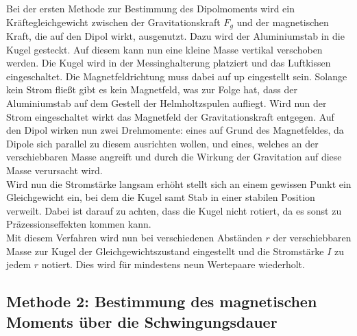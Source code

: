 Bei der ersten Methode zur Bestimmung des Dipolmoments wird ein Kräftegleichgewicht zwischen der Gravitationskraft $F_g$ und der magnetischen Kraft, die auf den Dipol 
wirkt, ausgenutzt. Dazu wird der Aluminiumstab in die Kugel gesteckt. Auf diesem kann nun eine kleine Masse vertikal verschoben werden. Die Kugel wird in der Messinghalterung platziert
und das Luftkissen eingeschaltet. Die Magnetfeldrichtung muss dabei auf \dq up\dq \: eingestellt sein. Solange kein Strom fließt gibt es kein Magnetfeld, was zur Folge hat,
dass der Aluminiumstab auf dem Gestell der Helmholtzspulen aufliegt. Wird nun der Strom eingeschaltet wirkt das Magnetfeld der Gravitationskraft entgegen.
Auf den Dipol wirken nun zwei Drehmomente: eines auf Grund des Magnetfeldes, da Dipole sich parallel zu diesem ausrichten wollen, und eines, welches an der 
verschiebbaren Masse angreift und durch die Wirkung der Gravitation auf diese Masse verursacht wird. \\
Wird nun die Stromstärke langsam erhöht stellt sich an einem gewissen Punkt ein Gleichgewicht ein, bei dem die Kugel samt Stab in einer stabilen Position verweilt.
Dabei ist darauf zu achten, dass die Kugel nicht rotiert, da es sonst zu Präzessionseffekten kommen kann. \\
Mit diesem Verfahren wird nun bei verschiedenen Abständen $r$ der verschiebbaren Masse zur Kugel der Gleichgewichtszustand eingestellt und die Stromstärke $I$ zu jedem $r$ notiert. 
Dies wird für mindestens neun Wertepaare wiederholt.

\subsection{Methode 2: Bestimmung des magnetischen Moments über die Schwingungsdauer}
\label{subsec:Methode2}

